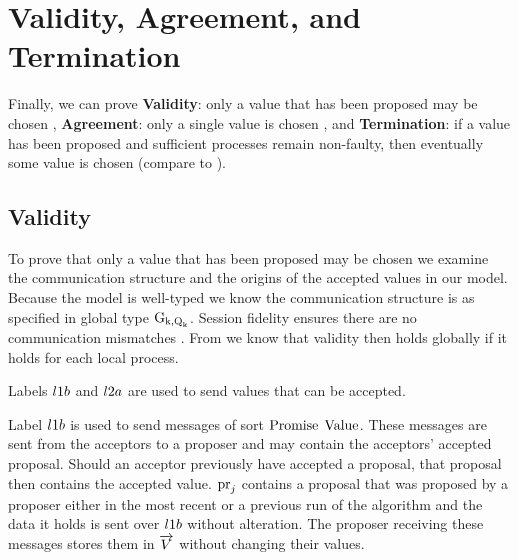 \section{Validity, Agreement, and Termination}
Finally, we can prove \textbf{Validity}: only a value that has been proposed may be chosen \cite{Lamport01}, \textbf{Agreement}: only a single value is chosen \cite{Lamport01}, and \textbf{Termination}: if a value has been proposed and sufficient processes remain non-faulty, then eventually some value is chosen (compare to \cite{Lamport05}).

\subsection{Validity}
To prove that only a value that has been proposed may be chosen we examine the communication structure and the origins of the accepted values in our model.
Because the model is well-typed we know the communication structure is as specified in global type $\operatorname{G_{k, \operatorname{Q}_{k}}}$.
Session fidelity ensures there are no communication mismatches \cite{PetersEtal21}.
From \cite{PetersEtal21} we know that validity then holds globally if it holds for each local process.

Labels $l1b$ and $l2a$ are used to send values that can be accepted.

Label $l1b$ is used to send messages of sort $\operatorname{Promise}\; \operatorname{Value}$.
These messages are sent from the acceptors to a proposer and may contain the acceptors' accepted proposal.
Should an acceptor previously have accepted a proposal, that proposal then contains the accepted value.
$\operatorname{pr}_{j}$ contains a proposal that was proposed by a proposer either in the most recent or a previous run of the algorithm and the data it holds is sent over $l1b$ without alteration.
The proposer receiving these messages stores them in $\overrightarrow{V}$ without changing their values.

